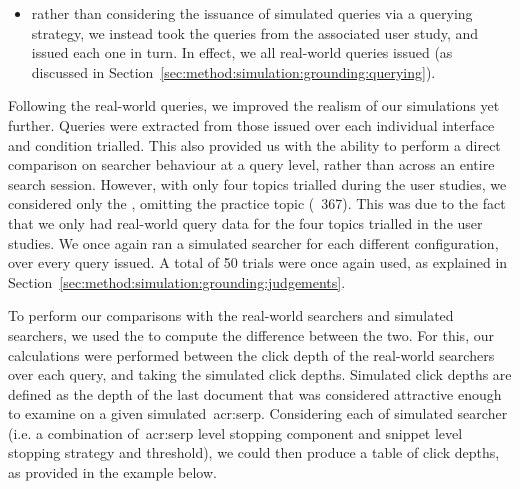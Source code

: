 \begin{itemize}
    \item{rather than considering the issuance of simulated queries via a querying strategy, we instead took the queries from the associated user study, and issued each one in turn. In effect, we  all real-world queries issued (as discussed in Section~\ref{sec:method:simulation:grounding:querying}).}
\end{itemize}

Following the real-world queries, we improved the realism of our simulations yet further. Queries were extracted from those issued over each individual interface and condition trialled. This also provided us with the ability to perform a direct comparison on searcher behaviour at a query level, rather than across an entire search session. However, with only four topics trialled during the user studies, we considered only the , omitting the practice topic (\textnumero~367). This was due to the fact that we only had real-world query data for the four topics trialled in the user studies. We once again ran a simulated searcher for each different configuration, over every query issued. A total of 50 trials were once again used, as explained in Section~\ref{sec:method:simulation:grounding:judgements}.

To perform our comparisons with the real-world searchers and simulated searchers, we used the  to compute the difference between the two. For this, our calculations were performed between the click depth of the real-world searchers over each query, and taking the simulated click depths. Simulated click depths are defined as the depth of the last document that was considered attractive enough to examine on a given simulated~\gls{acr:serp}. Considering each of simulated searcher (i.e. a combination of~\gls{acr:serp} level stopping component and snippet level stopping strategy and threshold), we could then produce a table of click depths, as provided in the example below.

\begin{figure}[h]
    \centering
    \vspace*{-8mm}
\end{figure}

